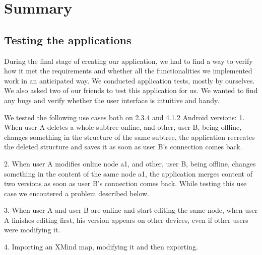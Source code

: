 %
%
%
%
%

\chapter{Summary}
\label{chap:summary}

\section{Testing the applications}
\label{sec:summary-testing}
During the final stage of creating our application, we had to find a way to verify how it met the requirements and whether all the functionalities we implemented work in an anticipated way. We conducted application tests, mostly by ourselves. We also asked two of our friends to test this application for us. We wanted to find any bugs and verify whether the user interface is intuitive and handy. 

We tested the following use cases both on 2.3.4 and 4.1.2 Android versions: 
1. When user A deletes a whole subtree online, and other, user B, being offline, changes something in the structure of the same subtree, the application recreates the deleted structure and saves it as soon as user B's connection comes back.

2.  When user A modifies online node a1, and other, user B, being offline, changes something in the content of the same node a1, the application merges content of two versions as soon as user B's connection comes back. 
While testing this use case we encoutered a problem described below. 

3. When user A and user B are online and start editing the same node, when user A finishes  editing first, his version appears on other devices, even if other users were modifying it.

4. Importing an XMind map, modifying it and then exporting. 

